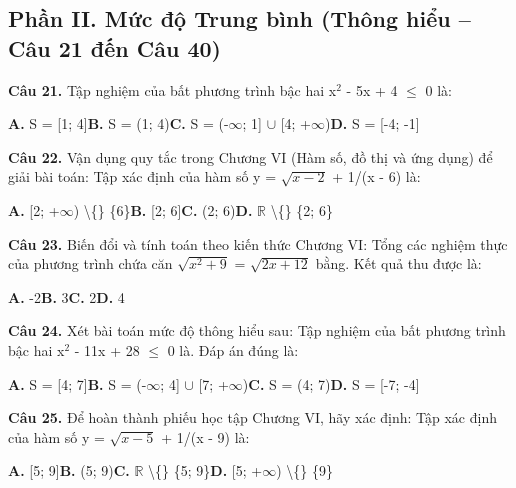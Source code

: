 \documentclass[11pt,a4paper]{article}
\begin{document}
\subsection*{\color{accent} Phần II. Mức độ Trung bình (Thông hiểu -- Câu 21 đến Câu 40)}
\textbf{\color{primary} Câu 21.} Tập nghiệm của bất phương trình bậc hai x$^2$ - 5x + 4 $\le$ 0 là:\par
\hspace*{1.5em}\textbf{A.} S = [1; 4]\quad\quad \textbf{B.} S = (1; 4)\quad\quad \textbf{C.} S = (-$\infty$; 1] $\cup$ [4; +$\infty$)\quad\quad \textbf{D.} S = [-4; -1]\par\vspace{2pt}
\textbf{\color{primary} Câu 22.} Vận dụng quy tắc trong Chương VI (Hàm số, đồ thị và ứng dụng) để giải bài toán: Tập xác định của hàm số y = $\sqrt{x - 2}$ + 1/(x - 6) là:\par
\hspace*{1.5em}\textbf{A.} [2; +$\infty$) \textbackslash\{\} \{6\}\quad\quad \textbf{B.} [2; 6]\quad\quad \textbf{C.} (2; 6)\quad\quad \textbf{D.} $\mathbb{R}$ \textbackslash\{\} \{2; 6\}\par\vspace{2pt}
\textbf{\color{primary} Câu 23.} Biến đổi và tính toán theo kiến thức Chương VI: Tổng các nghiệm thực của phương trình chứa căn $\sqrt{x^2 + 9}$ = $\sqrt{2x + 12}$ bằng. Kết quả thu được là:\par
\hspace*{1.5em}\textbf{A.} -2\quad\quad \textbf{B.} 3\quad\quad \textbf{C.} 2\quad\quad \textbf{D.} 4\par\vspace{2pt}
\textbf{\color{primary} Câu 24.} Xét bài toán mức độ thông hiểu sau: Tập nghiệm của bất phương trình bậc hai x$^2$ - 11x + 28 $\le$ 0 là. Đáp án đúng là:\par
\hspace*{1.5em}\textbf{A.} S = [4; 7]\quad\quad \textbf{B.} S = (-$\infty$; 4] $\cup$ [7; +$\infty$)\quad\quad \textbf{C.} S = (4; 7)\quad\quad \textbf{D.} S = [-7; -4]\par\vspace{2pt}
\textbf{\color{primary} Câu 25.} Để hoàn thành phiếu học tập Chương VI, hãy xác định: Tập xác định của hàm số y = $\sqrt{x - 5}$ + 1/(x - 9) là:\par
\hspace*{1.5em}\textbf{A.} [5; 9]\quad\quad \textbf{B.} (5; 9)\quad\quad \textbf{C.} $\mathbb{R}$ \textbackslash\{\} \{5; 9\}\quad\quad \textbf{D.} [5; +$\infty$) \textbackslash\{\} \{9\}\par\vspace{2pt}
\end{document}
